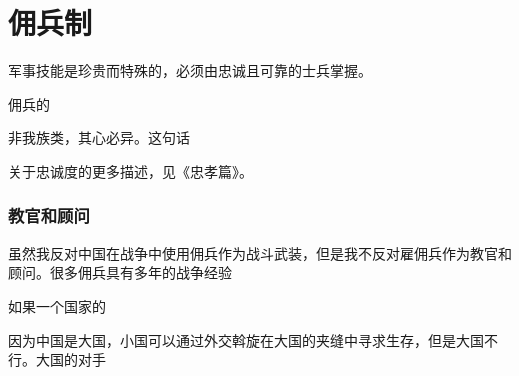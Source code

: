 \chapter{佣兵制}

军事技能是珍贵而特殊的，必须由忠诚且可靠的士兵掌握。

佣兵的

非我族类，其心必异。这句话

关于忠诚度的更多描述，见《忠孝篇》。

\subsection{教官和顾问}

虽然我反对中国在战争中使用佣兵作为战斗武装，但是我不反对雇佣兵作为教官和顾问。很多佣兵具有多年的战争经验


如果一个国家的

因为中国是大国，小国可以通过外交斡旋在大国的夹缝中寻求生存，但是大国不行。大国的对手
